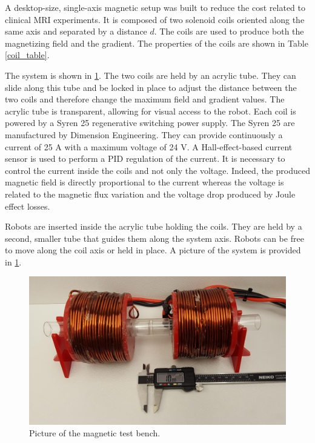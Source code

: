 \documentclass[letterpaper, 10 pt, conference]{ieeeconf}  %
\begin{document}
A desktop-size, single-axis magnetic setup was built to reduce the cost related to clinical MRI experiments.
 It is composed of two solenoid coils oriented along the same axis and separated by a distance $d$. 
 The coils are used to produce both the magnetizing field and the gradient. 
 The properties of the coils are shown in Table \ref{coil_table}.\par
The system is shown in \cref{magnetic_setup}.
 The two coils are held by an acrylic tube. 
 They can slide along this tube and be locked in place to adjust the distance between the two coils and therefore change the maximum field and gradient values. 
 The acrylic tube is transparent, allowing for visual access to the robot.
Each coil is powered by a Syren 25 regenerative switching power supply. The Syren 25 are manufactured by Dimension Engineering. They can provide continuously a current of 25 A with a maximum voltage of 24 V.
A Hall-effect-based current sensor is used to perform a PID regulation of the current. 
It is necessary to control the current inside the coils and not only the voltage. 
Indeed, the produced magnetic field is directly proportional to the current whereas the voltage is related to the magnetic flux variation and the voltage drop produced by Joule effect losses.\par
Robots are inserted inside the acrylic tube holding the coils. 
They are held by a second, smaller tube that guides them along the system axis. 
Robots can be free to move along the coil axis or held in place. 
A picture of the system is provided in \cref{magnetic_setup}.

\begin{figure}
  \includegraphics[width=\linewidth]{Magnetic_setup.jpg}
  \caption{Picture of the magnetic test bench.}
  \label{magnetic_setup}
\end{figure}
\end{document}
